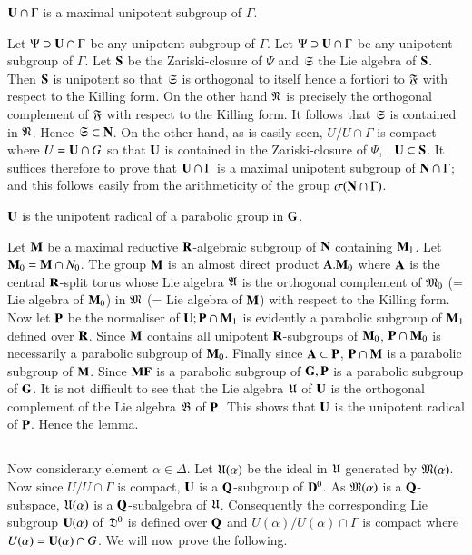 \setcounter{definition}{6}
\begin{lemma}\label{art9-lem4.7}
$\mathbf{U} \cap \Gamma$ is a maximal unipotent subgroup of $\Gamma$.
\end{lemma}

Let $\Psi \supset \mathbf{U} \cap \Gamma$ be any unipotent subgroup of $\Gamma$. Let $\Psi \supset \mathbf{U} \cap \Gamma$ be any unipotent subgroup of $\Gamma$. Let $\mathbf{S}$ be the Zariski-closure of $\Psi$ and $\mathfrak{S}$ the Lie algebra of $\mathbf{S}$. Then $\mathbf{S}$ is unipotent so that $\mathfrak{S}$ is orthogonal to itself hence a fortiori to $\mathfrak{F}$ with respect to the Killing form. On the other hand $\mathfrak{N}$ is precisely the orthogonal complement of $\mathfrak{F}$ with respect to the Killing form. It follows that $\mathfrak{S}$ is contained in $\mathfrak{N}$. Hence $\mathfrak{S} \subset \mathbf{N}$. On the other hand, as is easily seen, $U/U \cap \Gamma$ is compact where $U = \mathbf{U} \cap G$ so that $\mathbf{U}$ is contained in the Zariski-closure of $\Psi$, \ie. $\mathbf{U} \subset \mathbf{S}$. It suffices therefore to prove that $\mathbf{U} \cap \Gamma$ is a maximal unipotent subgroup of $\mathbf{N} \cap \Gamma$; and this follows easily from the arithmeticity of the group $\sigma (\mathbf{N} \cap \Gamma)$.

\begin{lemma}\label{art9-lem4.8}
$\mathbf{U}$ is the unipotent radical of a parabolic group in $\mathbf{G}$.
\end{lemma}

Let $\mathbf{M}$ be a maximal reductive $\mathbf{R}$-algebraic subgroup of $\mathbf{N}$ containing $\mathbf{M}_1$. Let $\mathbf{M}_0 = \mathbf{M} \cap N_0$. The group $\mathbf{M}$ is an almost direct product $\mathbf{A}. \mathbf{M}_0$ where $\mathbf{A}$ is the central $\mathbf{R}$-split torus whose Lie algebra $\mathfrak{A}$ is the orthogonal complement of $\mathfrak{M}_0$ (= Lie algebra of $\mathbf{M}_0$) in $\mathfrak{M}$ (= Lie algebra of $\mathbf{M}$) with respect to the Killing form. Now let $\mathbf{P}$ be the normaliser of $\mathbf{U}; \mathbf{P} \cap \mathbf{M}_1$ is evidently a parabolic subgroup of $\mathbf{M}_1$ defined over $\mathbf{R}$. Since $\mathbf{M}$ contains all unipotent $\mathbf{R}$-subgroups of $\mathbf{M}_0$, $\mathbf{P} \cap \mathbf{M}_0$ is  necessarily a parabolic subgroup of $\mathbf{M}_0$. Finally since $\mathbf{A} \subset \mathbf{P}$, $\mathbf{P} \cap \mathbf{M}$ is a parabolic subgroup of $\mathbf{M}$. Since $\mathbf{M} \mathbf{F}$ is a parabolic subgroup of $\mathbf{G}, \mathbf{P}$ is a parabolic subgroup of $\mathbf{G}$. It is not difficult to see that the Lie algebra $\mathfrak{U}$ of $\mathbf{U}$ is the orthogonal complement of the Lie algebra $\mathfrak{B}$ of $\mathbf{P}$. This shows that $\mathbf{U}$ is the unipotent radical of $\mathbf{P}$. Hence the lemma.

\setcounter{subsection}{8}
\subsection{}\label{art9-subsec4.9}
Now consider\pageoriginale any element $\alpha \in \Delta$. Let $\mathfrak{U} (\alpha)$ be the ideal in $\mathfrak{U}$ generated by $\mathfrak{M} (\alpha)$. Now since $U / U \cap \Gamma$ is compact, $\mathbf{U}$ is a $\mathbf{Q}$-subgroup of $\mathbf{D}^0$. As $\mathfrak{M}(\alpha)$ is a $\mathbf{Q}$-subspace, $\mathfrak{U} (\alpha)$ is a $\mathbf{Q}$-subalgebra of $\mathfrak{U}$. Consequently the corresponding Lie subgroup $\mathbf{U} (\alpha)$ of $\mathfrak{D}^0$ is defined  over $\mathbf{Q}$ and $U (\alpha) / U (\alpha) \cap \Gamma$ is compact where $U (\alpha) = \mathbf{U} (\alpha) \cap G$. We will now prove the following.

